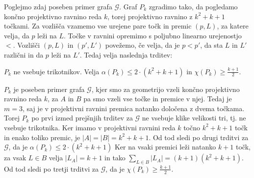 \documentclass[mat1, tisk]{fmfdelo}
\begin{document}
Poglejmo zdaj poseben primer grafa $\mathcal{G}$. Graf $P_k$ zgradimo tako, da pogledamo končno projektivno ravnino reda $k$, torej projektivno ravnino z $k^2 + k + 1$ točkami. Za vozlišča vzamemo vse urejene pare točk in premic $(p, L)$, za katere velja,
da $p$ leži na $L$. Točke v ravnini opremimo s poljubno linearno urejenostjo $<$. Vozlišči $(p, L)$ in $(p', L')$ povežemo, če velja, da je $p < p'$, da sta $L$ in $L'$ različni in da $p$ leži na $L'$. 
Tedaj velja naslednja trditev:

    \begin{trditev}
        $P_k$ ne vsebuje trikotnikov. Velja $\alpha(P_k) \leq 2 \cdot (k^2 + k + 1)$ in $\chi(P_k) \geq \frac{k + 1}{2}$.
    \end{trditev}

    \begin{dokaz}
        $P_k$ je poseben primer grafa $\mathcal{G}$, kjer smo za geometrijo vzeli končno projektivno ravnino reda $k$, za $A$ in $B$ pa smo vzeli vse točke in premice v njej. Tedaj je $m = 3$, saj je v projektivni
        ravnini premica natanko določena z dvema točkama. Torej $P_k$ po prvi izmed prejšnjih trditev za $\mathcal{G}$ ne vsebuje klike velikosti tri, tj. ne vsebuje trikotnika. Ker imamo v projektivni ravnini reda 
        $k$ točno $k^2 + k + 1$ točk in enako toliko premic, je $|A| = |B| = k^2 + k + 1$. Od tod sledi po drugi trditvi za $\mathcal{G}$, da je $\alpha(P_k) \leq 2 \cdot (k^2 + k + 1)$ Ker na vsaki premici leži natanko 
        $k + 1$ točk, za vsak $L \in B$ velja $|L_A| = k + 1$ in tako $\sum_{L \in B}|L_A| = (k + 1)(k^2 + k +1)$. Od tod sledi po tretji trditvi za $\mathcal{G}$, da je $\chi(P_k) \geq \frac{k + 1}{2}$.
    \end{dokaz}



    
\end{document}
